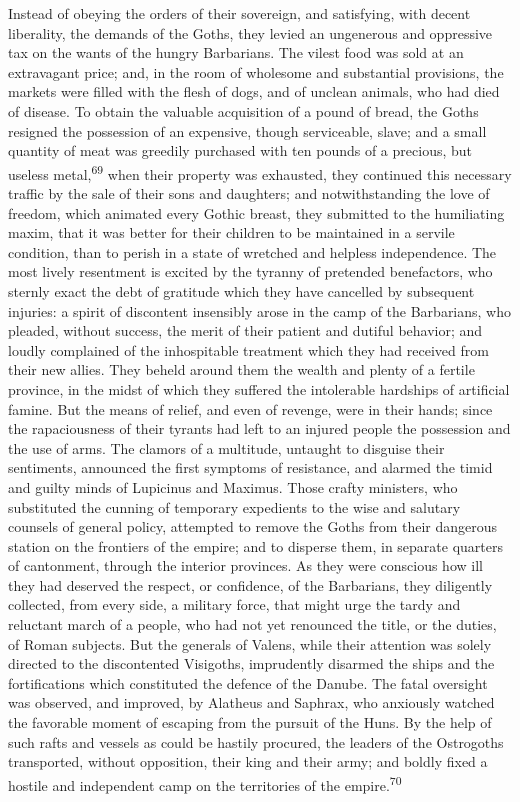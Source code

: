 Instead of obeying the orders of their sovereign, and satisfying,
with decent liberality, the demands of the Goths, they levied an
ungenerous and oppressive tax on the wants of the hungry
Barbarians. The vilest food was sold at an extravagant price;
and, in the room of wholesome and substantial provisions, the
markets were filled with the flesh of dogs, and of unclean
animals, who had died of disease. To obtain the valuable
acquisition of a pound of bread, the Goths resigned the
possession of an expensive, though serviceable, slave; and a
small quantity of meat was greedily purchased with ten pounds of
a precious, but useless metal,\textsuperscript{69} when their property was
exhausted, they continued this necessary traffic by the sale of
their sons and daughters; and notwithstanding the love of
freedom, which animated every Gothic breast, they submitted to
the humiliating maxim, that it was better for their children to
be maintained in a servile condition, than to perish in a state
of wretched and helpless independence. The most lively resentment
is excited by the tyranny of pretended benefactors, who sternly
exact the debt of gratitude which they have cancelled by
subsequent injuries: a spirit of discontent insensibly arose in
the camp of the Barbarians, who pleaded, without success, the
merit of their patient and dutiful behavior; and loudly
complained of the inhospitable treatment which they had received
from their new allies. They beheld around them the wealth and
plenty of a fertile province, in the midst of which they suffered
the intolerable hardships of artificial famine. But the means of
relief, and even of revenge, were in their hands; since the
rapaciousness of their tyrants had left to an injured people the
possession and the use of arms. The clamors of a multitude,
untaught to disguise their sentiments, announced the first
symptoms of resistance, and alarmed the timid and guilty minds of
Lupicinus and Maximus. Those crafty ministers, who substituted
the cunning of temporary expedients to the wise and salutary
counsels of general policy, attempted to remove the Goths from
their dangerous station on the frontiers of the empire; and to
disperse them, in separate quarters of cantonment, through the
interior provinces. As they were conscious how ill they had
deserved the respect, or confidence, of the Barbarians, they
diligently collected, from every side, a military force, that
might urge the tardy and reluctant march of a people, who had not
yet renounced the title, or the duties, of Roman subjects. But
the generals of Valens, while their attention was solely directed
to the discontented Visigoths, imprudently disarmed the ships and
the fortifications which constituted the defence of the Danube.
The fatal oversight was observed, and improved, by Alatheus and
Saphrax, who anxiously watched the favorable moment of escaping
from the pursuit of the Huns. By the help of such rafts and
vessels as could be hastily procured, the leaders of the
Ostrogoths transported, without opposition, their king and their
army; and boldly fixed a hostile and independent camp on the
territories of the empire.\textsuperscript{70}

